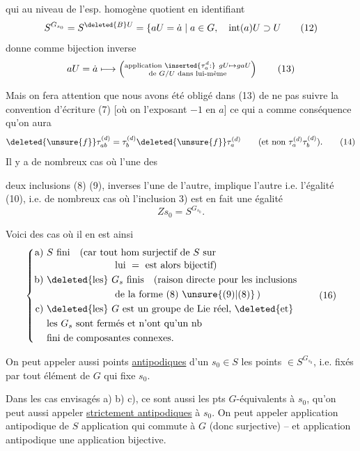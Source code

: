 qui au niveau de l'esp. homogène quotient en  identifiant
\[
S^{G_{s_0}}=S^{\deleted{B}U}=\{aU=\dot a\mid a\in G,\quad\operatorname{int}(a)U\supset U\tag*{(12)}
\]
donne comme bijection inverse
\[
aU=\dot a\longmapsto
\left(\substack{\text{application }\inserted{\tau_a^{d}:}\ gU\mapsto gaU\\\text{de }G/U\text{ dans lui-même}}\right)\tag*{(13)}
\]

Mais on fera attention que nous avons été obligé dans (13) de ne pas suivre la convention d'écriture (7) [où on  l'exposant $-1$ en $a$] ce qui a comme conséquence qu'on aura
\[
\deleted{\unsure{f}}\tau_{ab}^{(d)}=\tau_b^{(d)}\deleted{\unsure{f}}\tau_a^{(d)}\qquad(\text{et non }\tau_a^{(d)}\tau_b^{(d)}).\tag*{(14)}
\]
Il y a de nombreux cas où l'une des

deux inclusions (8) (9), inverses l'une de l'autre, implique l'autre i.e. l'égalité (10), i.e. de nombreux cas où l'inclusion 3) est en fait une égalité
\[
Zs_0=S^{G_{s_0}}.\tag*{(15)}
\]

Voici des cas où il en est ainsi
\[
\left\{\begin{aligned}
\text{a)}\ &S\text{ fini}\quad(\text{car tout hom surjectif de }S\text{ sur}\\[-2pt]
&\hspace{7em}\text{lui }=\text{ est alors bijectif})\\
\text{b)}\ &\deleted{\text{les}}\ G_s\text{ finis}\quad(\text{raison directe pour les inclusions}\\
&\hspace{7em}\text{de la forme (8) }\unsure{(9)|(8)}\,)\\
\text{c)}\ &\deleted{\text{les}}\ G\text{ est un groupe de Lie réel, }\deleted{\text{et}}\\
&\text{les }G_s\text{ sont fermés et n'ont qu'un nb}\\
&\text{fini de composantes connexes.}
\end{aligned}\right.\tag*{(16)}
\]

 On peut appeler aussi points \uline{antipodiques} d'un $s_0\in S$ les points   $\in S^{G_{s_0}}$, i.e. fixés par tout élément de $G$ qui  fixe $s_0$.

Dans les cas envisagés a) b) c), ce sont aussi les pts $G$-équivalents à $s_0$, qu'on peut aussi appeler \uline{strictement antipodiques} à $s_0$. On peut appeler application antipodique de $S$  application qui commute à $G$ (donc  surjective) --  et application antipodique une  application bijective.

